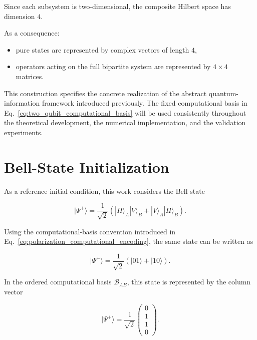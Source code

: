 Since each subsystem is two-dimensional, the composite Hilbert space has dimension \(4\).

As a consequence:
\begin{itemize}
    \item pure states are represented by complex vectors of length \(4\),
    \item operators acting on the full bipartite system are represented by \(4 \times 4\) matrices.
\end{itemize}

\medskip

This construction specifies the concrete realization of the abstract quantum-information framework introduced previously. The fixed computational basis in Eq.~\eqref{eq:two_qubit_computational_basis} will be used consistently throughout the theoretical development, the numerical implementation, and the validation experiments.


\section{Bell-State Initialization}

As a reference initial condition, this work considers the Bell state

\begin{equation}
|\Psi^{+}\rangle
=
\frac{1}{\sqrt{2}}
\left(
|H\rangle_A |V\rangle_B
+
|V\rangle_A |H\rangle_B
\right).
\label{eq:bell_psi_plus_polarization}
\end{equation}

Using the computational-basis convention introduced in Eq.~\eqref{eq:polarization_computational_encoding}, the same state can be written as

\begin{equation}
|\Psi^{+}\rangle
=
\frac{1}{\sqrt{2}}
\left(
|01\rangle + |10\rangle
\right).
\label{eq:bell_psi_plus}
\end{equation}

\medskip

In the ordered computational basis \( \mathcal{B}_{AB} \), this state is represented by the column vector

\begin{equation}
|\Psi^{+}\rangle
=
\frac{1}{\sqrt{2}}
\begin{pmatrix}
0\\
1\\
1\\
0
\end{pmatrix}.
\label{eq:bell_psi_plus_vector}
\end{equation}

